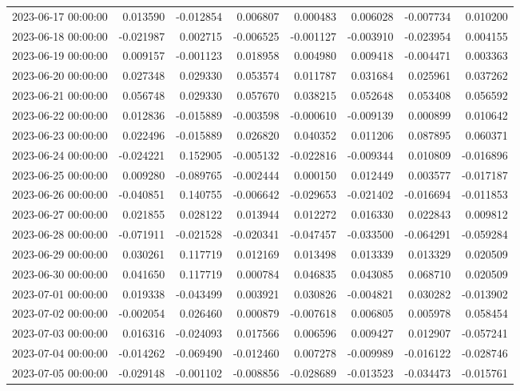 \begin{tabular}{lrrrrrrr}
2023-06-17 00:00:00 & 0.013590 & -0.012854 & 0.006807 & 0.000483 & 0.006028 & -0.007734 & 0.010200 \\
2023-06-18 00:00:00 & -0.021987 & 0.002715 & -0.006525 & -0.001127 & -0.003910 & -0.023954 & 0.004155 \\
2023-06-19 00:00:00 & 0.009157 & -0.001123 & 0.018958 & 0.004980 & 0.009418 & -0.004471 & 0.003363 \\
2023-06-20 00:00:00 & 0.027348 & 0.029330 & 0.053574 & 0.011787 & 0.031684 & 0.025961 & 0.037262 \\
2023-06-21 00:00:00 & 0.056748 & 0.029330 & 0.057670 & 0.038215 & 0.052648 & 0.053408 & 0.056592 \\
2023-06-22 00:00:00 & 0.012836 & -0.015889 & -0.003598 & -0.000610 & -0.009139 & 0.000899 & 0.010642 \\
2023-06-23 00:00:00 & 0.022496 & -0.015889 & 0.026820 & 0.040352 & 0.011206 & 0.087895 & 0.060371 \\
2023-06-24 00:00:00 & -0.024221 & 0.152905 & -0.005132 & -0.022816 & -0.009344 & 0.010809 & -0.016896 \\
2023-06-25 00:00:00 & 0.009280 & -0.089765 & -0.002444 & 0.000150 & 0.012449 & 0.003577 & -0.017187 \\
2023-06-26 00:00:00 & -0.040851 & 0.140755 & -0.006642 & -0.029653 & -0.021402 & -0.016694 & -0.011853 \\
2023-06-27 00:00:00 & 0.021855 & 0.028122 & 0.013944 & 0.012272 & 0.016330 & 0.022843 & 0.009812 \\
2023-06-28 00:00:00 & -0.071911 & -0.021528 & -0.020341 & -0.047457 & -0.033500 & -0.064291 & -0.059284 \\
2023-06-29 00:00:00 & 0.030261 & 0.117719 & 0.012169 & 0.013498 & 0.013339 & 0.013329 & 0.020509 \\
2023-06-30 00:00:00 & 0.041650 & 0.117719 & 0.000784 & 0.046835 & 0.043085 & 0.068710 & 0.020509 \\
2023-07-01 00:00:00 & 0.019338 & -0.043499 & 0.003921 & 0.030826 & -0.004821 & 0.030282 & -0.013902 \\
2023-07-02 00:00:00 & -0.002054 & 0.026460 & 0.000879 & -0.007618 & 0.006805 & 0.005978 & 0.058454 \\
2023-07-03 00:00:00 & 0.016316 & -0.024093 & 0.017566 & 0.006596 & 0.009427 & 0.012907 & -0.057241 \\
2023-07-04 00:00:00 & -0.014262 & -0.069490 & -0.012460 & 0.007278 & -0.009989 & -0.016122 & -0.028746 \\
2023-07-05 00:00:00 & -0.029148 & -0.001102 & -0.008856 & -0.028689 & -0.013523 & -0.034473 & -0.015761 \\

\end{tabular}
